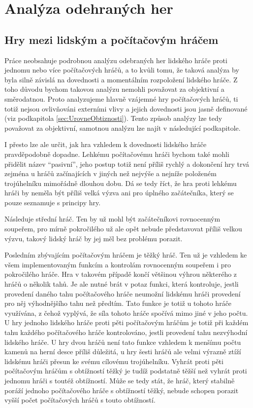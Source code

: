 \chapter{Analýza odehraných her}
\section{Hry mezi lidským a počítačovým hráčem}
Práce neobsahuje podrobnou analýzu odebraných her lidského hráče proti jednomu nebo více počítačových hráčů, a to kvůli tomu, že taková analýza by byla silně závislá na dovednosti a momentálním rozpoložení lidského hráče. Z toho důvodu bychom takovou analýzu nemohli považovat za objektivní a směrodatnou. Proto analyzujeme hlavně vzájemné hry počítačových hráčů, ti totiž nejsou ovlivňováni externími vlivy a jejich dovednosti jsou jasně definované (viz podkapitola \ref{sec:UrovneObtiznosti}). Tento způsob analýzy lze tedy považovat za objektivní, samotnou analýzu lze najít v následující podkapitole.

I přesto lze ale určit, jak hra vzhledem k dovednosti lidského hráče pravděpodobně dopadne. Lehkému počítačovému hráči bychom také mohli přidělit název \enquote{pasivní}, jeho postup totiž není příliš rychlý a dokončení hry trvá zejména u hráčů začínajících v jiných než nejvýše a nejníže položeném trojúhelníku mimořádně dlouhou dobu. Dá se tedy říct, že hra proti lehkému hráči by neměla být příliš velká výzva ani pro úplného začátečníka, který se pouze seznamuje s principy hry.

Následuje střední hráč. Ten by už mohl být začátečníkovi rovnocenným soupeřem, pro mírně pokročilého už ale opět nebude představovat příliš velkou výzvu, takový lidský hráč by jej měl bez problému porazit.

Posledním zbývajícím počítačovým hráčem je těžký hráč. Ten už je vzhledem ke všem implementovaným funkcím a kontrolám rovnocenným soupeřem i pro pokročilého hráče. Hra v takovém případě končí většinou výhrou některého z hráčů o několik tahů. Je ale nutné brát v potaz funkci, která kontroluje, jestli provedení daného tahu počítačového hráče neumožní lidskému hráči provedení pro něj výhodnějšího tahu než předtím. Tato funkce je totiž u tohoto hráče využívána, z čehož vyplývá, že síla tohoto hráče spočívá mimo jiné v jeho počtu. U hry jednoho lidského hráče proti pěti počítačovým hráčům je totiž při každém tahu každého počítačového hráče kontrolováno, jestli provedení tahu nezvýhodní lidského hráče. U hry dvou hráčů není tato funkce vzhledem k menšímu počtu kamenů na herní desce příliš důležitá, u hry šesti hráčů ale velmi výrazně ztíží lidskému hráči přesun ke svému cílovému trojúhelníku. Vyhrát proti pěti počítačovým hráčům s obtížností těžký je tudíž podstatně těžší než vyhrát proti jednomu hráči s toutéž obtížností. Může se tedy stát, že hráč, který stabilně poráží jednoho počítačového hráče s obtížností těžký, nebude schopen porazit vyšší počet počítačových hráčů s touto obtížností.

